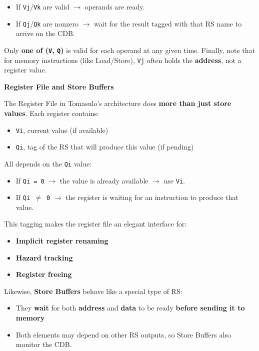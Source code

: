 \begin{itemize}
    \item If \texttt{Vj}/\texttt{Vk} are valid $\rightarrow$ operands are ready.
    \item If \texttt{Qj}/\texttt{Qk} are nonzero $\rightarrow$ wait for the result tagged with that RS name to arrive on the CDB.
\end{itemize}
Only \textbf{one of (\texttt{V}, \texttt{Q})} is valid for each operand at any given time. Finally, note that for memory instructions (like Load/Store), \texttt{Vj} often holds the \textbf{address}, not a register value.

\newpage

\begin{flushleft}
    \textcolor{Green3}{ \textbf{Register File and Store Buffers}}
\end{flushleft}
The Register File in Tomasulo's architecture does \textbf{more than just store values}. Each register contains:
\begin{itemize}
    \item \texttt{Vi}, current value (if available)
    \item \texttt{Qi}, tag of the RS that will produce this value (if pending)
\end{itemize}
All depends on the \texttt{Qi} value:
\begin{itemize}
    \item If \texttt{Qi = 0} $\rightarrow$ the value is already available $\rightarrow$ use \texttt{Vi}.
    \item If \texttt{Qi $\ne$ 0} $\rightarrow$ the register is waiting for an instruction to produce that value.
\end{itemize}
This tagging makes the register file an elegant interface for:
\begin{itemize}
    \item \textbf{Implicit register renaming}
    \item \textbf{Hazard tracking}
    \item \textbf{Register freeing}
\end{itemize}
Likewise, \textbf{Store Buffers} behave like a special type of RS:
\begin{itemize}
    \item They \textbf{wait} for both \textbf{address} and \textbf{data} to be ready \textbf{before sending it to memory}
    \item Both elements may depend on other RS outputs, so Store Buffers also monitor the CDB.
\end{itemize}

